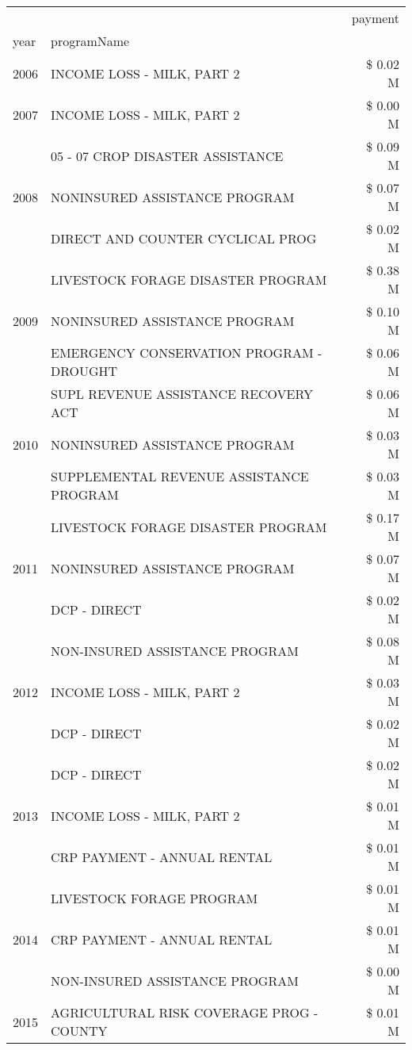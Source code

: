 \begin{tabular}{llr}
\toprule
 &  & payment \\
year & programName &  \\
\midrule
2006 & INCOME LOSS - MILK, PART 2 & \$ 0.02 M \\
\cline{1-3}
2007 & INCOME LOSS - MILK, PART 2 & \$ 0.00 M \\
\cline{1-3}
\multirow[t]{3}{*}{2008} & 05 - 07 CROP DISASTER ASSISTANCE & \$ 0.09 M \\
 & NONINSURED ASSISTANCE PROGRAM & \$ 0.07 M \\
 & DIRECT AND COUNTER CYCLICAL PROG & \$ 0.02 M \\
\cline{1-3}
\multirow[t]{3}{*}{2009} & LIVESTOCK FORAGE DISASTER  PROGRAM & \$ 0.38 M \\
 & NONINSURED ASSISTANCE PROGRAM & \$ 0.10 M \\
 & EMERGENCY CONSERVATION PROGRAM - DROUGHT & \$ 0.06 M \\
\cline{1-3}
\multirow[t]{3}{*}{2010} & SUPL REVENUE ASSISTANCE RECOVERY ACT & \$ 0.06 M \\
 & NONINSURED ASSISTANCE PROGRAM & \$ 0.03 M \\
 & SUPPLEMENTAL REVENUE ASSISTANCE PROGRAM & \$ 0.03 M \\
\cline{1-3}
\multirow[t]{3}{*}{2011} & LIVESTOCK FORAGE DISASTER PROGRAM & \$ 0.17 M \\
 & NONINSURED ASSISTANCE PROGRAM & \$ 0.07 M \\
 & DCP - DIRECT & \$ 0.02 M \\
\cline{1-3}
\multirow[t]{3}{*}{2012} & NON-INSURED ASSISTANCE PROGRAM & \$ 0.08 M \\
 & INCOME LOSS - MILK, PART 2 & \$ 0.03 M \\
 & DCP - DIRECT & \$ 0.02 M \\
\cline{1-3}
\multirow[t]{3}{*}{2013} & DCP - DIRECT & \$ 0.02 M \\
 & INCOME LOSS - MILK, PART 2 & \$ 0.01 M \\
 & CRP PAYMENT - ANNUAL RENTAL & \$ 0.01 M \\
\cline{1-3}
\multirow[t]{3}{*}{2014} & LIVESTOCK FORAGE PROGRAM & \$ 0.01 M \\
 & CRP PAYMENT - ANNUAL RENTAL & \$ 0.01 M \\
 & NON-INSURED ASSISTANCE PROGRAM & \$ 0.00 M \\
\cline{1-3}
\multirow[t]{3}{*}{2015} & AGRICULTURAL RISK COVERAGE PROG - COUNTY & \$ 0.01 M \\

\end{tabular}
